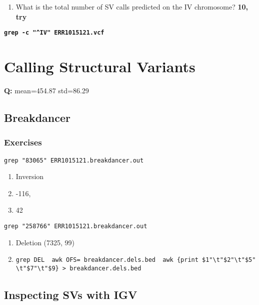 \documentclass[11pt]{article}
\providecommand{\tightlist}{%
      \setlength{\itemsep}{0pt}\setlength{\parskip}{0pt}}
\begin{document}
\begin{enumerate}
\def\labelenumi{\arabic{enumi}.}
\setcounter{enumi}{6}
\tightlist
\item
  What is the total number of SV calls predicted on the IV chromosome?
  \textbf{10, try}
\end{enumerate}

\textbf{\texttt{grep\ -c\ "\^{}IV"\ ERR1015121.vcf}}

    \hypertarget{calling-structural-variants}{%
\section{Calling Structural
Variants}\label{calling-structural-variants}}

\textbf{Q:} mean=454.87 std=86.29

\hypertarget{breakdancer}{%
\subsection{Breakdancer}\label{breakdancer}}

\hypertarget{exercises}{%
\subsubsection{Exercises}\label{exercises}}

\texttt{grep\ "83065"\ ERR1015121.breakdancer.out}

\begin{enumerate}
\def\labelenumi{\arabic{enumi}.}
\item
  Inversion
\item
  -116,
\item
  42
\end{enumerate}

\texttt{grep\ "258766"\ ERR1015121.breakdancer.out}

\begin{enumerate}
\def\labelenumi{\arabic{enumi}.}
\setcounter{enumi}{3}
\item
  Deletion (7325, 99)
\item
  \texttt{grep\ DEL\ \textbar{}\ awk\ OFS=\ breakdancer.dels.bed\ \textbar{}\ awk\ \textquotesingle{}\{print\ \$1"\textbackslash{}t"\$2"\textbackslash{}t"\$5"\textbackslash{}t"\$7"\textbackslash{}t"\$9\}\textquotesingle{}\ \textgreater{}\ breakdancer.dels.bed}
\end{enumerate}

\hypertarget{inspecting-svs-with-igv}{%
\subsection{Inspecting SVs with IGV}\label{inspecting-svs-with-igv}}
\end{document}
